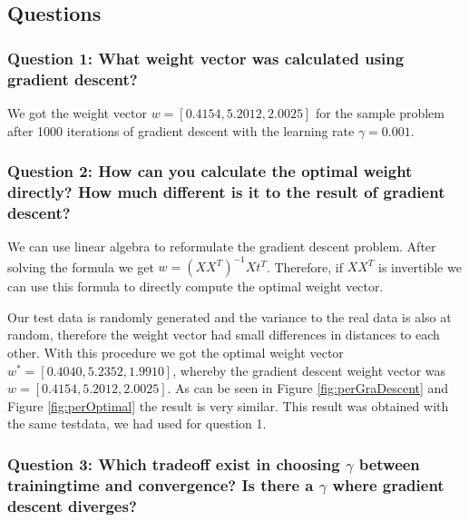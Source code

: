 \subsection{Questions}

\subsubsection{Question 1: What weight vector was calculated using gradient descent?}

We got the weight vector $w = [0.4154, 5.2012, 2.0025]$ for the sample problem after 1000 iterations of gradient descent with the learning rate $\gamma = 0.001$.

\subsubsection{Question 2: How can you calculate the optimal weight directly? How much different is it to the result of gradient descent?}

We can use linear algebra to reformulate the gradient descent problem. After solving the formula we get $w = (XX^T)^{-1}Xt^T$. Therefore, if $XX^T$ is invertible we can use this formula to directly compute the optimal weight vector.

Our test data is randomly generated and the variance to the real data is also at random, therefore the weight vector had small differences in distances to each other. With this procedure we got the optimal weight vector $w^* = [0.4040, 5.2352, 1.9910]$, whereby the gradient descent weight vector was $w = [0.4154, 5.2012, 2.0025]$. As can be seen in Figure \ref{fig:perGraDescent} and Figure \ref{fig:perOptimal} the result is very similar. This result was obtained with the same testdata, we had used for question 1. 

\subsubsection{Question 3: Which tradeoff exist in choosing $\gamma$ between trainingtime and convergence? Is there a $\gamma$ where gradient descent diverges?}


